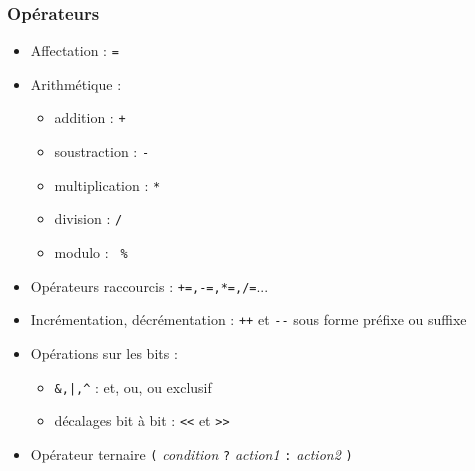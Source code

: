 \begin{frame}[fragile]
\frametitle{Opérateurs}
\begin{itemize}
\item Affectation : \verb|=|
\item Arithmétique :
\begin{itemize}
\item addition : \verb|+|
\item soustraction : \verb|-|
\item multiplication : \verb|*|
\item division : \verb|/|
\item modulo : \verb| %|
\end{itemize}
\item Opérateurs raccourcis : \verb|+=,-=,*=,/=|...
\item Incrémentation, décrémentation : \verb|++| et \verb|--| sous forme préfixe ou suffixe
\item Opérations sur les bits :
\begin{itemize}
\item \verb#&,|,^# : et, ou, ou exclusif
\item décalages bit à bit : \verb|<<| et \verb|>>|
\end{itemize}
\item Opérateur ternaire \verb|(| \textit{condition} \verb|?| \textit{action1} \verb|:| \textit{action2} \verb|)|
\end{itemize}
\end{frame}

